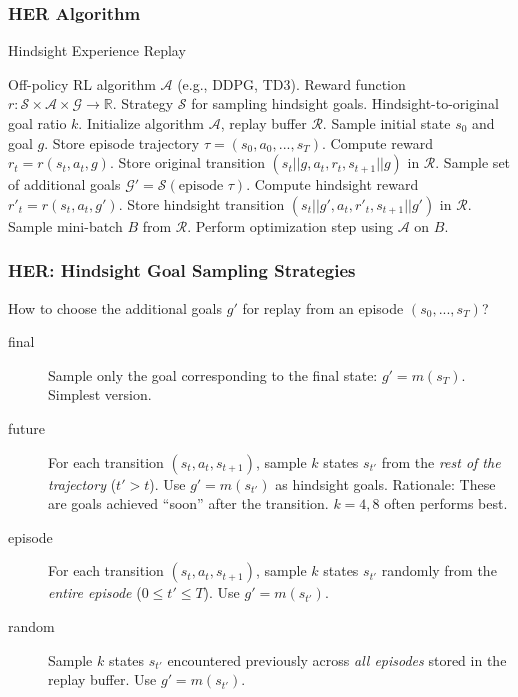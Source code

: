 \documentclass[9pt, aspectratio=169]{beamer}
\begin{document}
\begin{frame}
  \frametitle{HER Algorithm}
    \begin{algorithm}[H]
    \captionsetup{font=small}
    \caption{Hindsight Experience Replay}
    \begin{algorithmic}[1]
    \scriptsize
    \REQUIRE Off-policy RL algorithm $\mathcal{A}$ (e.g., DDPG, TD3).
    \REQUIRE Reward function $r: \mathcal{S} \times \mathcal{A} \times \mathcal{G} \to \mathbb{R}$.
    \REQUIRE Strategy $\mathcal{S}$ for sampling hindsight goals.
    \REQUIRE Hindsight-to-original goal ratio $k$.
    \STATE Initialize algorithm $\mathcal{A}$, replay buffer $\mathcal{R}$.
        \STATE Sample initial state $s_0$ and goal $g$. Store episode trajectory $\tau = (s_0, a_0, ..., s_T)$.
            \STATE Compute reward $r_t = r(s_t, a_t, g)$.
            \STATE Store original transition $(s_t || g, a_t, r_t, s_{t+1} || g)$ in $\mathcal{R}$. 
            \STATE Sample set of additional goals $\mathcal{G}' = \mathcal{S}(\text{episode } \tau)$.
                 \STATE Compute hindsight reward $r'_t = r(s_t, a_t, g')$.
                 \STATE Store hindsight transition $(s_t || g', a_t, r'_t, s_{t+1} || g')$ in $\mathcal{R}$. 
            \ENDFOR
        \ENDFOR
             \STATE Sample mini-batch $B$ from $\mathcal{R}$.
             \STATE Perform optimization step using $\mathcal{A}$ on $B$.
        \ENDFOR
    \ENDFOR
    \end{algorithmic}
    \end{algorithm}
\end{frame}

\begin{frame}
  \frametitle{HER: Hindsight Goal Sampling Strategies}
    How to choose the additional goals $g'$ for replay from an episode $(s_0, ..., s_T)$?
    \begin{description}
        \item[final] Sample only the goal corresponding to the final state: $g' = m(s_T)$. Simplest version.

        \item[future] For each transition $(s_t, a_t, s_{t+1})$, sample $k$ states $s_{t'}$ from the \textit{rest of the trajectory} ($t' > t$). Use $g' = m(s_{t'})$ as hindsight goals. Rationale: These are goals achieved ``soon'' after the transition. $k=4,8$ often performs best.

        \item[episode] For each transition $(s_t, a_t, s_{t+1})$, sample $k$ states $s_{t'}$ randomly from the \textit{entire episode} ($0 \le t' \le T$). Use $g' = m(s_{t'})$.

        \item[random] Sample $k$ states $s_{t'}$ encountered previously across \textit{all episodes} stored in the replay buffer. Use $g' = m(s_{t'})$.
    \end{description}
\end{frame}
\end{document}
